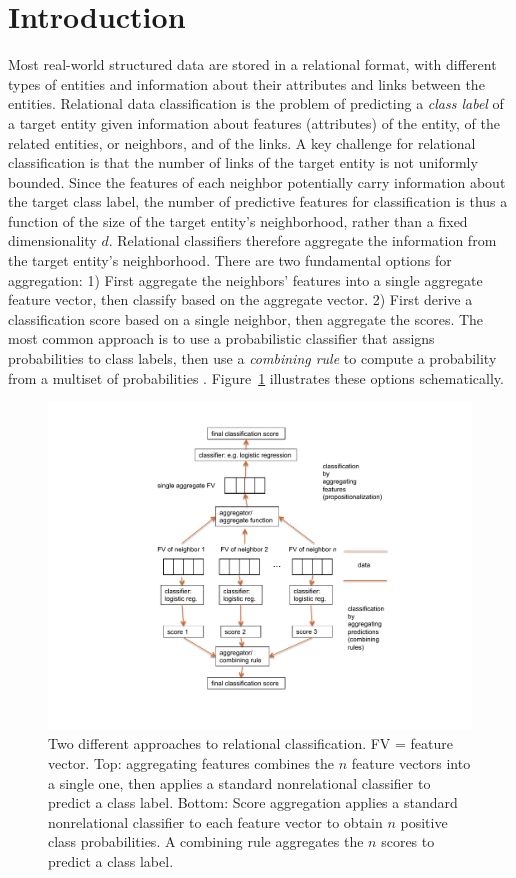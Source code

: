 \documentclass[conference]{IEEEtran}
\begin{document}
\section{Introduction}
Most real-world structured data are stored in a relational format, with different types of entities and information about their attributes and links between the entities.
Relational data classification is the problem of predicting a {\em class label} of a target entity given information about features (attributes) of the entity, of the related entities, or neighbors, and of the links.
A key challenge for relational classification is that the number of links of the target entity is not uniformly bounded. Since the features of each neighbor potentially carry information about the target class label, the number of predictive features for classification is thus a function of the size of the target entity's neighborhood, rather than a fixed dimensionality $d$. Relational classifiers therefore aggregate the information from the target entity's neighborhood. There are two fundamental options for aggregation: 1) First aggregate the neighbors' features into a single aggregate feature vector, then classify based on the aggregate vector. 2) First derive a classification score based on a single neighbor, then aggregate the scores. The most common approach is to use a probabilistic classifier that assigns probabilities to class labels, then use a {\em combining rule} to compute a probability from a multiset of probabilities \cite{Pearl1988,Kersting2007}.
%
Figure~\ref{fig:classify} illustrates these options schematically.
\begin{figure}[htbp]
\begin{center}
\includegraphics[width = 0.5 \textwidth]{classify}
\caption{Two different approaches to relational classification. FV = feature vector. Top: aggregating features combines the $n$ feature vectors into a single one, then applies a standard nonrelational classifier to predict a class label. Bottom: Score aggregation applies a standard nonrelational classifier to each feature vector to obtain $n$ positive class probabilities. A combining rule aggregates the $n$ scores to predict a class label.}
\label{fig:classify}
\end{center}
\end{figure}
\end{document}
